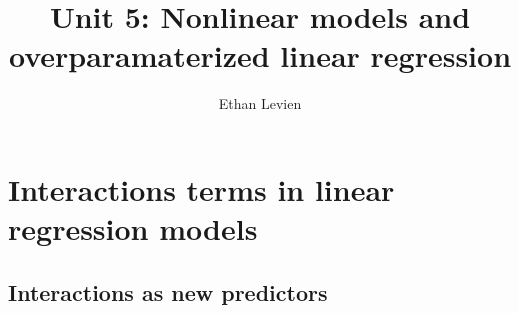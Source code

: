 

\setcounter{unit}{5}
\setcounter{section}{0}





\title{Unit 5: Nonlinear models and overparamaterized linear regression }
\author{Ethan Levien}
\maketitle
\tableofcontents




\section{Interactions terms in linear regression models}
\subsection{Interactions as new predictors}


